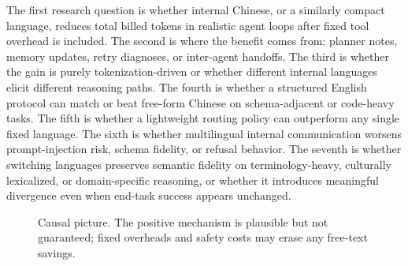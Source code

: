 \documentclass[11pt]{article}
\begin{document}
The first research question is whether internal Chinese, or a similarly compact language, reduces total billed tokens in realistic agent loops after fixed tool overhead is included. The second is where the benefit comes from: planner notes, memory updates, retry diagnoses, or inter-agent handoffs. The third is whether the gain is purely tokenization-driven or whether different internal languages elicit different reasoning paths. The fourth is whether a structured English protocol can match or beat free-form Chinese on schema-adjacent or code-heavy tasks. The fifth is whether a lightweight routing policy can outperform any single fixed language. The sixth is whether multilingual internal communication worsens prompt-injection risk, schema fidelity, or refusal behavior. The seventh is whether switching languages preserves semantic fidelity on terminology-heavy, culturally lexicalized, or domain-specific reasoning, or whether it introduces meaningful divergence even when end-task success appears unchanged.

\begin{figure}[t]
\centering
{}
\caption{Causal picture. The positive mechanism is plausible but not guaranteed; fixed overheads and safety costs may erase any free-text savings.}
\label{fig:causal}
\end{figure}
\end{document}
